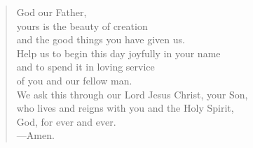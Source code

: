 \prayer

\setlength{\vleftmargin}{\prayerleftmargini}

\begin{verse}
God our Father,\\
yours is the beauty of creation\\
and the good things you have given us.\\
Help us to begin this day joyfully in your name\\
and to spend it in loving service\\
of you and our fellow man.\\
We ask this through our Lord Jesus Christ, your Son,\\
who lives and reigns with you and the Holy Spirit,\\
God, for ever and ever.\\
{\color{red}---\thinspace}Amen.
\end{verse}

\setlength{\vleftmargin}{\defleftmargini}